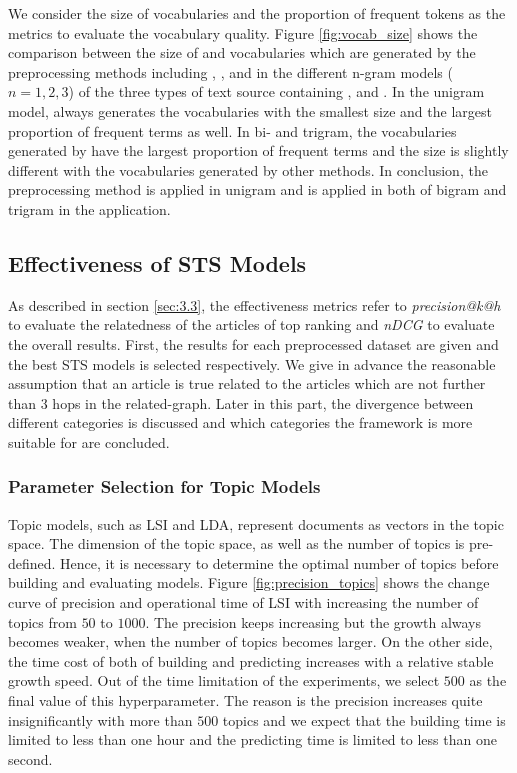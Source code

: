 We consider the size of \ifull{} vocabularies and the proportion of frequent tokens as the metrics to evaluate the vocabulary quality. Figure \ref{fig:vocab_size} shows the comparison between the size of \ifull{} and \icommon{} vocabularies which are generated by the preprocessing methods including \iSP{}, \iSE{}, \iST{} and \iSS{} in the different n-gram models ($n=1, 2, 3$) of the three types of text source containing \icontent{}, \ititle{} and \isummary{}. In the unigram model, \iSS{} always generates the vocabularies with the smallest size and the largest proportion of frequent terms as well. In bi- and trigram, the vocabularies generated by \iSE{} have the largest proportion of frequent terms and the size is slightly different with the vocabularies generated by other methods. In conclusion, the preprocessing method \iSS{} is applied in unigram and \iSE{} is applied in both of bigram and trigram in the application. 


\subsection{Effectiveness of STS Models}
\label{sec:5.2}

As described in section \ref{sec:3.3}, the effectiveness metrics refer to \textit{precision@k@h} to evaluate the relatedness of the articles of top ranking and \textit{nDCG} to evaluate the overall results. First, the results for each preprocessed dataset are given and the best STS models is selected respectively. We give in advance the reasonable assumption that an article is true related to the articles which are not further than $3$ hops in the related-graph. Later in this part, the divergence between different categories is discussed and which categories the framework is more suitable for are concluded.  

\subsubsection{Parameter Selection for Topic Models}

Topic models, such as LSI and LDA, represent documents as vectors in the topic space. The dimension of the topic space, as well as the number of topics is pre-defined. Hence, it is necessary to determine the optimal number of topics before building and evaluating models. Figure \ref{fig:precision_topics} shows the change curve of precision and operational time of LSI with increasing the number of topics from $50$ to $1000$. The precision keeps increasing but the growth always becomes weaker, when the number of topics becomes larger. On the other side, the time cost of both of building and predicting increases with a relative stable growth speed. Out of the time limitation of the experiments, we select $500$ as the final value of this hyperparameter. The reason is the precision increases quite insignificantly with more than $500$ topics and we expect that the building time is limited to less than one hour and the predicting time is limited to less than one second. 

